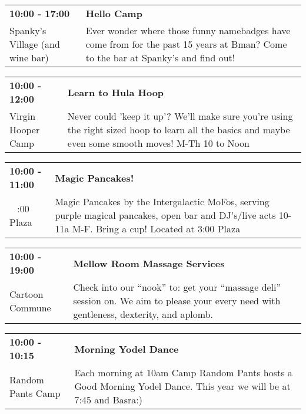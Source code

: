 \begin{tabular}{ p{1in} p{2.2in} }
    \textbf{10:00 - 17:00} & \textbf{Hello Camp} \\
    Spanky's Village (and wine bar) \newline  & Ever wonder where those funny namebadges have come from for the past 15 years at Bman?  Come to the bar at Spanky's and find out! \\
    \hline 
\end{tabular}
    
\begin{tabular}{ p{1in} p{2.2in} }
    \textbf{10:00 - 12:00} & \textbf{Learn to Hula Hoop} \\
    Virgin Hooper Camp \newline  & Never could 'keep it up'? We'll make sure you're using the right sized hoop to learn all the basics and maybe even some smooth moves! M-Th 10 to Noon \\
    \hline 
\end{tabular}
    
\begin{tabular}{ p{1in} p{2.2in} }
    \textbf{10:00 - 11:00} & \textbf{Magic Pancakes!} \\
    ~ \newline 3:00 Plaza & Magic Pancakes by the Intergalactic MoFos, serving purple magical pancakes, open bar and DJ's/live acts 10-11a M-F. Bring a cup! Located at 3:00 Plaza \\
    \hline 
\end{tabular}
    
\begin{tabular}{ p{1in} p{2.2in} }
    \textbf{10:00 - 19:00} & \textbf{Mellow Room Massage Services} \\
    Cartoon Commune \newline  & Check into our ``nook'' to: get your ``massage deli'' session on. We aim to please your every need with gentleness, dexterity, and aplomb. \\
    \hline 
\end{tabular}
    
\begin{tabular}{ p{1in} p{2.2in} }
    \textbf{10:00 - 10:15} & \textbf{Morning Yodel Dance} \\
    Random Pants Camp \newline  & Each morning at 10am Camp Random Pants hosts a Good Morning Yodel Dance. This year we will be at 7:45 and Basra:) \\
    \hline 
\end{tabular}
    
